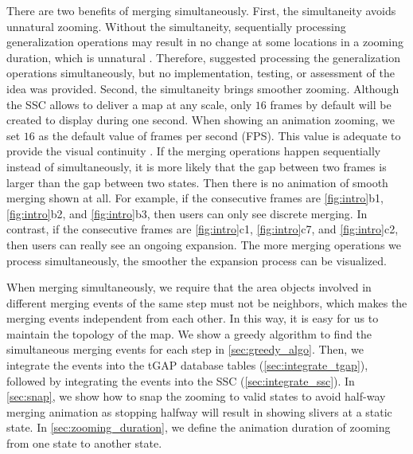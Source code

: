 \documentclass[twocolumn]{svjour3}          %
\begin{document}
There are two benefits of merging simultaneously.
First, the simultaneity avoids unnatural zooming.
Without the simultaneity,
sequentially processing generalization operations 
may result in no change at some locations in a zooming duration, 
which is unnatural \citep{vanOosterom2014Support}. 
Therefore, \citet{vanOosterom2014Support} 
suggested processing the generalization operations simultaneously,
but no implementation, testing, or assessment of the idea was provided.
Second, the simultaneity brings smoother zooming.
Although the SSC allows to deliver a map at any scale,
only $16$ frames by default will be created to display during one second.
When showing an animation zooming, 
we set $16$ as the default value of frames per second (FPS).
This value is adequate to provide the visual continuity
\citep[]{Read2000Film}.
If the merging operations happen sequentially instead of simultaneously,
it is more likely that
the gap between two frames is larger than the gap between two states.
Then there is no animation of smooth merging shown at all.
For example, if the consecutive frames are 
\figs\ref{fig:intro}b1, \ref{fig:intro}b2, and \ref{fig:intro}b3,
then users can only see discrete merging.
In contrast, if the consecutive frames are 
\figs\ref{fig:intro}c1, \ref{fig:intro}c7, and \ref{fig:intro}c2,
then users can really see an ongoing expansion. 
The more merging operations we process simultaneously, 
the smoother the expansion process can be visualized.


When merging simultaneously,
we require that 
the area objects involved in different merging events of the same step 
must not be neighbors, 
which makes the merging events independent from each other.
In this way, it is easy for us to maintain the topology of the map.
We show a greedy algorithm 
to find the simultaneous merging events for each step
in \sect\ref{sec:greedy_algo}.
Then, we integrate the events into the tGAP database tables
(\sect\ref{sec:integrate_tgap}),
followed by integrating the events into the SSC 
(\sect\ref{sec:integrate_ssc}).
In \sect\ref{sec:snap}, we show how to snap the zooming to valid states
to avoid half-way merging animation 
as stopping halfway will result in showing slivers at a static state.
In \sect\ref{sec:zooming_duration}, we define 
the animation duration of zooming from one state to another state.
\end{document}

